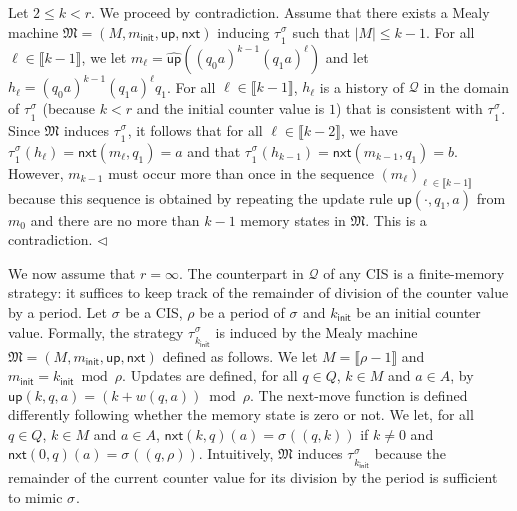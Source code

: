 \documentclass[a4paper,UKenglish,cleveref,autoref,thm-restate,colorlinks]{lipics-v2021}
\newcommand{\init}{\mathsf{init}}
\newcommand{\integerInterval}[1]{\llbracket{}#1\rrbracket{}}
\newcommand{\hist}{h}
\newcommand{\indexPosition}{\ell}
\newcommand{\weight}{w}
\newcommand{\ocmdp}{\mathcal{Q}}
\newcommand{\ocStateSpace}{Q}
\newcommand{\ocState}{q}
\newcommand{\ocCount}{k}
\newcommand{\ocActionSpace}{A}
\newcommand{\ocAction}{a}
\newcommand{\ocActionB}{b}
\newcommand{\counterUB}{r}
\newcommand{\period}{\rho}
\newcommand{\mealy}{\mathfrak{M}}
\newcommand{\mealyStateSpace}{M}
\newcommand{\mealyState}{m}
\newcommand{\mealyStateInit}{\mealyState_\init}
\newcommand{\mealyUpdate}{\mathsf{up}}
\newcommand{\mealyNext}{\mathsf{nxt}}
\newcommand{\mealyUpdateHat}{\widehat{\mealyUpdate}}
\newcommand{\mealyTuple}{(\mealyStateSpace, \mealyStateInit, \mealyUpdate, \mealyNext)}
\newcommand{\stratGeneric}[1]{{\sigma_{#1}}}
\newcommand{\strat}{\stratGeneric{}}
\newcommand{\stratBGeneric}[1]{{\tau_{#1}}}
\newcommand{\stratB}{\stratBGeneric{}}
\begin{document}
\begin{example}
  Let $2\leq \ocCount < \counterUB$.
  We proceed by contradiction.
  Assume that there exists a Mealy machine $\mealy = \mealyTuple$ inducing $\stratB^\strat_1$ such that $|\mealyStateSpace|\leq\ocCount-1$.
  For all $\indexPosition\in\integerInterval{\ocCount-1}$, we let $\mealyState_\indexPosition = \mealyUpdateHat((\ocState_0\ocAction)^{\ocCount-1}(\ocState_1\ocAction)^\indexPosition)$ and let $\hist_\indexPosition = (\ocState_0\ocAction)^{\ocCount-1}(\ocState_1\ocAction)^{\indexPosition}\ocState_1$.
  For all $\indexPosition\in\integerInterval{\ocCount-1}$, $\hist_\indexPosition$ is a history of $\ocmdp$ in the domain of $\stratB^\strat_1$ (because $\ocCount < \counterUB$ and the initial counter value is $1$) that is consistent with $\stratB^\strat_1$.
  Since $\mealy$ induces $\stratB^{\strat}_1$, it follows that for all $\indexPosition\in\integerInterval{\ocCount-2}$, we have $\stratB^{\strat}_1(\hist_\indexPosition) = \mealyNext(\mealyState_\indexPosition, \ocState_1) = \ocAction$ and that $\stratB^{\strat}_1(\hist_{\ocCount-1}) = \mealyNext(\mealyState_{\ocCount-1}, \ocState_1) = \ocActionB$.
  However, $\mealyState_{\ocCount-1}$ must occur more than once in the sequence $(\mealyState_\indexPosition)_{\indexPosition\in\integerInterval{\ocCount-1}}$ because this sequence is obtained by repeating the update rule $\mealyUpdate(\cdot, \ocState_1, \ocAction)$ from $\mealyState_0$ and there are no more than $\ocCount-1$ memory states in $\mealy$.
  This is a contradiction.
  \hfill$\lhd$
\end{example}

We now assume that $\counterUB=\infty$.
The counterpart in $\ocmdp$ of any CIS is a finite-memory strategy: it suffices to keep track of the remainder of division of the counter value by a period.
Let $\strat$ be a CIS, $\period$ be a period of $\strat$ and $\ocCount_\init$ be an initial counter value.
Formally, the strategy $\stratB^{\strat}_{\ocCount_\init}$ is induced by the Mealy machine $\mealy = \mealyTuple$ defined as follows.
We let $\mealyStateSpace = \integerInterval{\period -1}$ and $\mealyStateInit = \ocCount_\init\bmod\period$.
Updates are defined, for all $\ocState\in\ocStateSpace$, $\ocCount\in\mealyStateSpace$ and $\ocAction\in\ocActionSpace$, by $\mealyUpdate(\ocCount, \ocState, \ocAction) = (\ocCount + \weight(\ocState, \ocAction))\bmod\period$.
The next-move function is defined differently following whether the memory state is zero or not.
We let, for all $\ocState\in\ocStateSpace$, $\ocCount\in\mealyStateSpace$ and $\ocAction\in\ocActionSpace$, $\mealyNext(\ocCount, \ocState)(\ocAction) = \strat((\ocState, \ocCount))$ if $\ocCount\neq 0$ and $\mealyNext(0, \ocState)(\ocAction) = \strat((\ocState, \period))$.
Intuitively, $\mealy$ induces $\stratB^\strat_{\ocCount_\init}$ because  the remainder of the current counter value for its division by the period is sufficient to mimic $\strat$.
\end{document}
